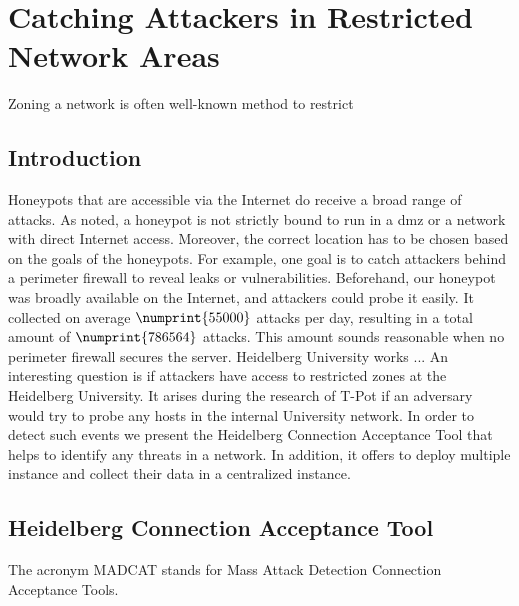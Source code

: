 \chapter{Catching Attackers in Restricted Network Areas}
\label{chap:concept}

Zoning a network is often well-known method to restrict 

\section{Introduction}

Honeypots that are accessible via the Internet do receive a broad range of attacks.
As \citet{Spitzner2003} noted, a honeypot is not strictly bound to run in a \ac{dmz} or a network with direct Internet access.
Moreover, the correct location has to be chosen based on the goals of the honeypots.
For example, one goal is to catch attackers behind a perimeter firewall to reveal leaks or vulnerabilities.
Beforehand, our honeypot was broadly available on the Internet, and attackers could probe it easily.
It collected on average $\numprint{55000}$ attacks per day, resulting in a total amount of $\numprint{786564}$ attacks.
This amount sounds reasonable when no perimeter firewall secures the server.
Heidelberg University works ...%
An interesting question is if attackers have access to restricted zones at the Heidelberg University.
It arises during the research of T-Pot if an adversary would try to probe any hosts in the internal University network.
In order to detect such events we present the Heidelberg Connection Acceptance Tool that helps to identify any threats in a network.
In addition, it offers to deploy multiple instance and collect their data in a centralized instance. 

\section{Heidelberg Connection Acceptance Tool}

The acronym MADCAT stands for Mass Attack Detection Connection Acceptance Tools.

